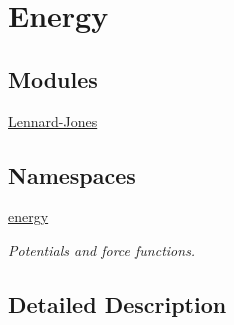 \hypertarget{group___energy}{}\section{Energy}
\label{group___energy}
\subsection*{Modules}
\begin{DoxyCompactItemize}
\item 
\mbox{\hyperlink{group___lennard-_jones}{Lennard-\/\+Jones}}
\end{DoxyCompactItemize}
\subsection*{Namespaces}
\begin{DoxyCompactItemize}
\item 
 \mbox{\hyperlink{namespaceenergy}{energy}}
\begin{DoxyCompactList}\small\item\em Potentials and force functions. \end{DoxyCompactList}\end{DoxyCompactItemize}


\subsection{Detailed Description}

